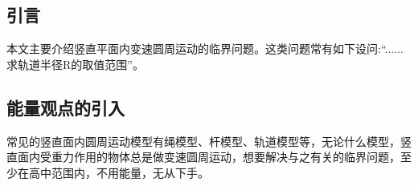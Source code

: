 

\subsection{引言}
本文主要介绍竖直平面内变速圆周运动的临界问题。这类问题常有如下设问:“......求轨道半径R的取值范围”。

\subsection{能量观点的引入}
常见的竖直面内圆周运动模型有绳模型、杆模型、轨道模型等，无论什么模型，竖直面内受重力作用的物体总是做变速圆周运动，想要解决与之有关的临界问题，至少在高中范围内，不用能量，无从下手。